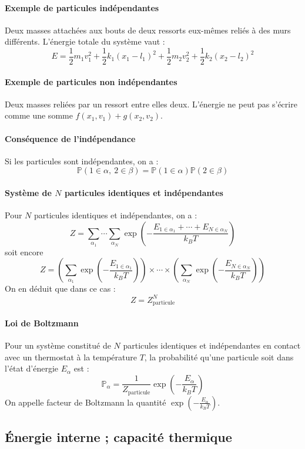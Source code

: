 \documentclass[french]{book}
\theoremstyle{plain}
\theoremstyle{definition}
\theoremstyle{remark}
\renewcommand{\P}{\mathbb{P}}
\begin{document}
\paragraph{Exemple de particules indépendantes} Deux masses attachées aux bouts de deux ressorts eux-mêmes reliés à des murs différents. L'énergie totale du système vaut : $$E=\frac{1}{2}m_1v_1^2+\frac{1}{2}k_1(x_1-l_1)^2+\frac{1}{2}m_2v_2^2+\frac{1}{2}k_2(x_2-l_2)^2$$

\paragraph{Exemple de particules non indépendantes} Deux masses reliées par un ressort entre elles deux. L'énergie ne peut pas s'écrire comme une somme $f(x_1,v_1)+g(x_2,v_2)$.

\paragraph{Conséquence de l'indépendance} Si les particules sont indépendantes, on a : $$\P(1\in \alpha,\ 2\in\beta)=\P(1\in\alpha)\P(2\in\beta)$$

\paragraph{Système de $N$ particules identiques et indépendantes} Pour $N$ particules identiques et indépendantes, on a : $$Z=\sum_{\alpha_1}\cdots\sum_{\alpha_N}\exp\left(-\frac{E_{1\in\alpha_1}+\cdots+E_{N\in\alpha_N}}{k_BT}\right)$$ soit encore $$Z=\left(\sum_{\alpha_1}\exp\left(-\frac{E_{1\in\alpha_1}}{k_BT}\right)\right)\times\cdots\times\left(\sum_{\alpha_N}\exp\left(-\frac{E_{N\in\alpha_N}}{k_BT}\right)\right)$$ On en déduit que dans ce cas : $$Z=Z_{\text{particule}}^N$$

\paragraph{Loi de Boltzmann} Pour un système constitué de $N$ particules identiques et indépendantes en contact avec un thermostat à la température $T$, la probabilité qu'une particule soit dans l'état d'énergie $E_\alpha$ est : $$\P_\alpha=\frac{1}{Z_{\text{particule}}}\exp\left(-\frac{E_\alpha}{k_BT}\right)$$ On appelle facteur de Boltzmann la quantité $\displaystyle\exp\left(-\frac{E_\alpha}{k_BT}\right)$.

\subsection{Énergie interne ; capacité thermique}
\end{document}
